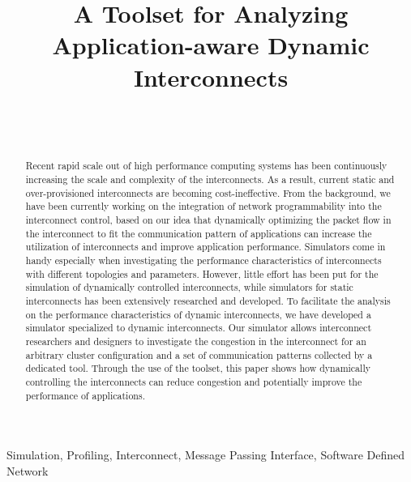 \documentclass[conference]{IEEEtran}
\begin{document}
\title{A Toolset for Analyzing Application-aware Dynamic Interconnects}

\author{%
     \\
     \\
}

\maketitle

\begin{abstract}
    Recent rapid scale out of high performance computing systems has
    been continuously increasing the scale and complexity of the
    interconnects. As a result, current static and over-provisioned
    interconnects are becoming cost-ineffective. From the background, we have
    been currently working on the integration of network programmability into
    the interconnect control, based on our idea that dynamically optimizing
    the packet flow in the interconnect to fit the communication pattern of
    applications can increase the utilization of interconnects and improve
    application performance. Simulators come in handy especially when
    investigating the performance characteristics of interconnects with
    different topologies and parameters. However, little effort has been put
    for the simulation of dynamically controlled interconnects, while
    simulators for static interconnects has been extensively researched and
    developed. To facilitate the analysis on the performance characteristics
    of dynamic interconnects, we have developed a simulator specialized to
    dynamic interconnects. Our simulator allows interconnect researchers and
    designers to investigate the congestion in the interconnect for an
    arbitrary cluster configuration and a set of communication patterns
    collected by a dedicated tool. Through the use of the toolset, this paper
    shows how dynamically controlling the interconnects can reduce congestion
    and potentially improve the performance of applications.
\end{abstract}

\begin{IEEEkeywords}
    Simulation, Profiling, Interconnect, Message Passing Interface, Software
    Defined Network
\end{IEEEkeywords}
\end{document}
